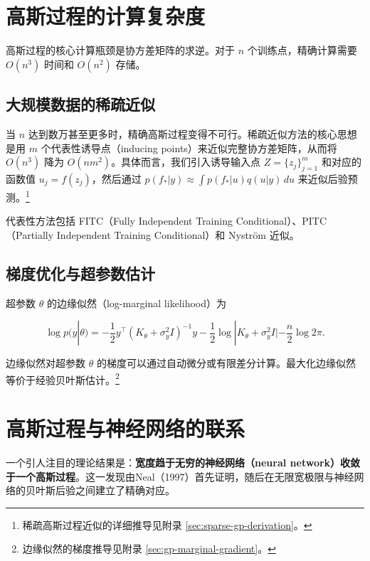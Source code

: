 \section{高斯过程的计算复杂度}\label{sec:gp-computation}

高斯过程的核心计算瓶颈是协方差矩阵的求逆。对于 $n$ 个训练点，精确计算需要 $O(n^3)$ 时间和 $O(n^2)$ 存储。

\subsection{大规模数据的稀疏近似}

当 $n$ 达到数万甚至更多时，精确高斯过程变得不可行。稀疏近似方法的核心思想是用 $m$ 个代表性诱导点（inducing points）来近似完整协方差矩阵，从而将 $O(n^3)$ 降为 $O(n m^2)$。具体而言，我们引入诱导输入点 $Z = \{z_j\}_{j=1}^m$ 和对应的函数值 $u_j = f(z_j)$，然后通过 $p(f_* | y) \approx \int p(f_* | u) q(u | y) \, du$ 来近似后验预测。\footnote{稀疏高斯过程近似的详细推导见附录 \cref{sec:sparse-gp-derivation}。}

代表性方法包括 FITC（Fully Independent Training Conditional）、PITC（Partially Independent Training Conditional）和 Nystr\"om 近似。

\subsection{梯度优化与超参数估计}

超参数 $\theta$ 的边缘似然（log-marginal likelihood）为

\begin{equation}
\log p(y | \theta) = -\frac{1}{2} y^\top (K_\theta + \sigma_y^2 I)^{-1} y - \frac{1}{2} \log |K_\theta + \sigma_y^2 I| - \frac{n}{2} \log 2\pi. \label{eq:gp-marginal-likelihood}
\end{equation}

边缘似然对超参数 $\theta$ 的梯度可以通过自动微分或有限差分计算。最大化边缘似然等价于经验贝叶斯估计。\footnote{边缘似然的梯度推导见附录 \cref{sec:gp-marginal-gradient}。}

\section{高斯过程与神经网络的联系}\label{sec:gp-nn-connection}

一个引人注目的理论结果是：\textbf{宽度趋于无穷的神经网络（neural network）收敛于一个高斯过程}。这一发现由Neal（1997）首先证明，随后在无限宽极限与神经网络的贝叶斯后验之间建立了精确对应。

